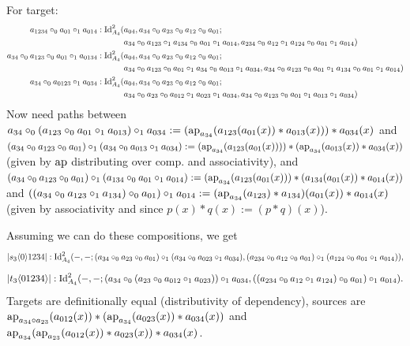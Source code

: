 \documentclass{article}
\begin{document}
For target:
\begin{align*}
    a_{1234}\circ_0a_{01}\circ_1a_{014}:\operatorname{Id}_{A_4}^2(&a_{04},a_{34}\circ_0a_{23}\circ_0a_{12}\circ_0a_{01};\\
    &a_{34}\circ_0a_{123}\circ_1a_{134}\circ_0a_{01}\circ_1a_{014},a_{234}\circ_0a_{12}\circ_1a_{124}\circ_0a_{01}\circ_1a_{014})\\
    a_{34}\circ_0a_{123}\circ_0a_{01}\circ_1a_{0134}:\operatorname{Id}_{A_4}^2(&a_{04},a_{34}\circ_0a_{23}\circ_0a_{12}\circ_0a_{01};\\
    &a_{34}\circ_0a_{123}\circ_0a_{01}\circ_1a_{34}\circ_0a_{013}\circ_1a_{034},a_{34}\circ_0a_{123}\circ_0a_{01}\circ_1a_{134}\circ_0a_{01}\circ_1a_{014})\\
    a_{34}\circ_0a_{0123}\circ_1a_{034}:\operatorname{Id}_{A_4}^2(&a_{04},a_{34}\circ_0a_{23}\circ_0a_{12}\circ_0a_{01};\\
    &a_{34}\circ_0a_{23}\circ_0a_{012}\circ_1a_{023}\circ_1a_{034},a_{34}\circ_0a_{123}\circ_0a_{01}\circ_1a_{013}\circ_1a_{034})\\
\end{align*}
Now need paths between $a_{34}\circ_0(a_{123}\circ_0a_{01}\circ_1a_{013})\circ_1a_{034}:=(\operatorname{ap}_{a_{34}}(a_{123}(a_{01}(x))*a_{013}(x)))*a_{034}(x)$ and $(a_{34}\circ_0a_{123}\circ_0a_{01})\circ_1(a_{34}\circ_0a_{013}\circ_1a_{034}):=(\operatorname{ap}_{a_{34}}(a_{123}(a_{01}(x))))*(\operatorname{ap}_{a_{34}}(a_{013}(x))*a_{034}(x))$ (given by $\operatorname{ap}$ distributing over comp. and associativity), and \newline
$(a_{34}\circ_0a_{123}\circ_0a_{01})\circ_1(a_{134}\circ_0a_{01}\circ_1a_{014}):=(\operatorname{ap}_{a_{34}}(a_{123}(a_{01}(x)))*(a_{134}(a_{01}(x))*a_{014}(x))$ and \newline
$((a_{34}\circ_0a_{123}\circ_1a_{134})\circ_0a_{01})\circ_1a_{014}:=(\operatorname{ap}_{a_{34}}(a_{123})*a_{134})(a_{01}(x))*a_{014}(x)$ (given by associativity and since $p(x)*q(x):=(p*q)(x)$).

Assuming we can do these compositions, we get
$$ |s_3\langle0\rangle1234|:\operatorname{Id}_{A_4}^2(-,-;(a_{34}\circ_0a_{23}\circ_0a_{01})\circ_1(a_{34}\circ_0a_{023}\circ_1a_{034}),(a_{234}\circ_0a_{12}\circ_0a_{01})\circ_1(a_{124}\circ_0a_{01}\circ_1a_{014})), $$
$$ |t_3\langle01234\rangle|:\operatorname{Id}_{A_4}^2(-,-;(a_{34}\circ_0(a_{23}\circ_0a_{012}\circ_1a_{023}))\circ_1a_{034},((a_{234}\circ_0a_{12}\circ_1a_{124})\circ_0a_{01})\circ_1a_{014}). $$
Targets are definitionally equal (distributivity of dependency), sources are $\operatorname{ap}_{a_{34}\circ a_{23}}(a_{012}(x))*(\operatorname{ap}_{a_{34}}(a_{023}(x))*a_{034}(x))$ and $\operatorname{ap}_{a_{34}}(\operatorname{ap}_{a_{23}}(a_{012}(x))*a_{023}(x))*a_{034}(x)$.
\end{document}
